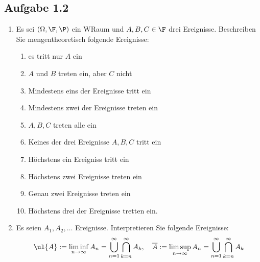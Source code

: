\subsection{Aufgabe 1.2}
\begin{enumerate}
	\item Es sei $(\Omega, \F, \P)$ ein WRaum und $A,B,C \in \F$ drei Ereignisse. Beschreiben Sie mengentheoretisch folgende Ereignisse:
	\begin{enumerate}
		\item es tritt nur $A$ ein
		\item $A$ und $B$ treten ein, aber $C$ nicht
		\item Mindestens eins der Ereignisse tritt ein
		\item Mindestens zwei der Ereignisse treten ein
		\item $A,B,C$ treten alle ein
		\item Keines der drei Ereignisse $A,B,C$ tritt ein
		\item Höchstens ein Ereigniss tritt ein
		\item Höchstens zwei Ereignisse treten ein
		\item Genau zwei Ereignisse treten ein
		\item Höchstens drei der Ereignisse tretten ein.
	\end{enumerate}
	\item Es seien $A_1,A_2, \dots$ Ereignisse. Interpretieren Sie folgende Ereignisse:
		\begin{align*}
			\ul{A}:= \liminf_{n \to \infty} A_n = \bigcup_{n=1}^{\infty}\bigcap_{k=n}^{\infty} A_k, \quad \overline{A}:= \limsup_{n \to \infty} A_n = \bigcup_{n=1}^{\infty}\bigcap_{k=n}^{\infty} A_k
		\end{align*}
\end{enumerate}

